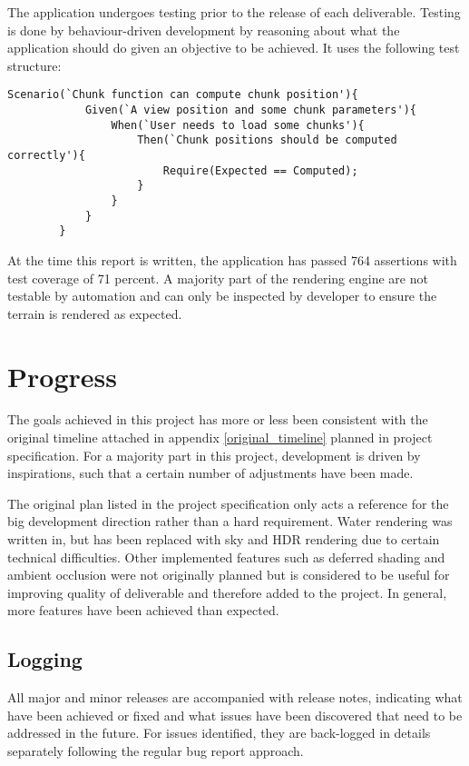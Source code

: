 \documentclass[oneside, a4paper]{report}
\begin{document}
    The application undergoes testing prior to the release of each deliverable. Testing is done by behaviour-driven development by reasoning about what the application should do given an objective to be achieved. It uses the following test structure:

    \begin{lstlisting}[breaklines=true, autogobble=true, frame=tb]
        Scenario(`Chunk function can compute chunk position'){
            Given(`A view position and some chunk parameters'){
                When(`User needs to load some chunks'){
                    Then(`Chunk positions should be computed correctly'){
                        Require(Expected == Computed);
                    }
                }
            }
        }
    \end{lstlisting}

    At the time this report is written, the application has passed 764 assertions with test coverage of 71 percent. A majority part of the rendering engine are not testable by automation and can only be inspected by developer to ensure the terrain is rendered as expected.

    \section{Progress}

    The goals achieved in this project has more or less been consistent with the original timeline attached in appendix \ref{original_timeline} planned in project specification. For a majority part in this project, development is driven by inspirations, such that a certain number of adjustments have been made.

    The original plan listed in the project specification only acts a reference for the big development direction rather than a hard requirement. Water rendering was written in, but has been replaced with sky and HDR rendering due to certain technical difficulties. Other implemented features such as deferred shading and ambient occlusion were not originally planned but is considered to be useful for improving quality of deliverable and therefore added to the project. In general, more features have been achieved than expected.

    \subsection{Logging}

    All major and minor releases are accompanied with release notes, indicating what have been achieved or fixed and what issues have been discovered that need to be addressed in the future. For issues identified, they are back-logged in details separately following the regular bug report approach.
    
\end{document}
